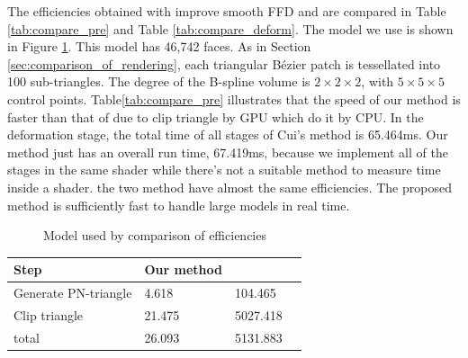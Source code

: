 \documentclass[3p]{elsarticle}
\makeatletter
\newcommand\tabcaption{\def\@captype{table}\caption}
\makeatother
\begin{document}
The efficiencies obtained with improve smooth FFD and \cite{Cui15} are compared in Table \ref{tab:compare_pre} and Table \ref{tab:compare_deform}. The model we use is shown in Figure \ref{fig:snail}. This model has 46,742 faces. As in Section \ref{sec:comparison_of_rendering}, each triangular B\'ezier patch is tessellated into 100 sub-triangles. The degree of the B-spline volume is $2\times2\times2$, with $5\times5\times5$ control points. Table\ref{tab:compare_pre} illustrates that the speed of our method is faster than that of \cite{Cui15} due to clip triangle by GPU which \cite{Cui15} do it by CPU. In the deformation stage, the total time of all stages of Cui's method is 65.464ms. Our method just has an overall run time, 67.419ms, because we implement all of the stages in the same shader while there's not a suitable method to measure time inside a shader. the two method have almost the same efficiencies. The proposed method is sufficiently fast to handle large models in real time.

\begin{figure}
  \centering
  \hfill
  \hfill
  \caption{Model used by comparison of efficiencies}
  \label{fig:snail}
\end{figure}

\begin{minipage}[c]{0.99\textwidth} 
  \centering
  \footnotesize
    \tabcaption{Comparison of the efficiencies of our method and \cite{Cui15}(pre-compute stage)}
  \begin{tabular}{llll}
  	\hline
  	Step & Our method & \cite{Cui15}\\
  	\hline
  	Generate PN-triangle         & 4.618   & 104.465     \\
  	Clip triangle                & 21.475  & 5027.418    \\
  	\hline
  	total                        & 26.093  & 5131.883    \\
  	\hline
  \end{tabular}
    \label{tab:compare_pre}
\end{minipage} 
\end{document}
